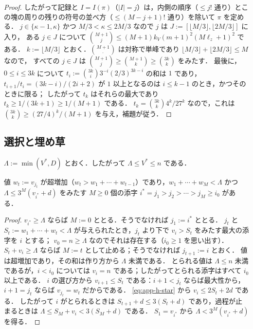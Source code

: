 \begin{proof}
したがって記録と $I=I(\pi)$（$|I|=j$）は，内側の順序（$\le j!$ 通り）とこの塊の周りの残りの符号の並べ方（$\le(M-j+1)!$ 通り）を除いて $\pi$ を定める．
$j\in\{\kappa-1,\kappa\}$ かつ $M/3<\kappa\le2M/3$ なので $j$ は $J:=[\lfloor M/3\rfloor,\lfloor2M/3\rfloor]$ に入り，
ある $j\in J$ について $\binom{M+1}{j}\le(M+1)k_V(m+1)^2(M\ell_z+1)^2$ である．
$k:=\lfloor M/3\rfloor$ とおく．$\binom{M+1}{\cdot}$ は対称で単峰であり $\lfloor M/3\rfloor+\lfloor2M/3\rfloor\le M$ なので，
すべての $j\in J$ は $\binom{M+1}{j}\ge\binom{M+1}{k}\ge\binom{3k}{k}$ をみたす．
最後に，$0\le i\le3k$ について $t_i:=\binom{3k}{i}3^{-i}(2/3)^{3k-i}$ の和は $1$ であり，
$t_{i+1}/t_i=(3k-i)/(2i+2)$ が $1$ 以上となるのは $i\le k-1$ のとき，かつそのときに限る；
したがって $t_k$ はそれらの最大であり $t_k\ge1/(3k+1)\ge1/(M+1)$ である．
$t_k=\binom{3k}{k}4^k/27^k$ なので，これは $\binom{3k}{k}\ge(27/4)^k/(M+1)$ を与え，補題が従う．
\end{proof}

\subsection{選択と埋め草}

$\Lambda:=\min(V^*,D)$ とおく．したがって $\Lambda\le V^*\le n$ である．

\begin{lemma}[選択]
\label{lem:app-h-select}
値 $w_t:=v_{j_t}$ が超増加（$w_t>w_1+\cdots+w_{t-1}$）であり，$w_1+\cdots+w_M<\Lambda$ かつ $\Lambda\le3^M(v_{i^*}+d)$ をみたす
$M\ge0$ 個の添字 $i^*=j_1>j_2>\cdots>j_M\ge i_0$ がある．
\end{lemma}

\begin{proof}
$v_{i^*}\ge\Lambda$ ならば $M:=0$ ととる．そうでなければ $j_1:=i^*$ ととる．
$j_t$ と $S_t:=w_1+\cdots+w_t<\Lambda$ が与えられたとき，$j_t$ より下で $v_i>S_t$ をみたす最大の添字を $i$ とする；
$v_0=n\ge\Lambda$ なのでそれは存在する（$i_0\ge1$ を思い出す）．
$S_t+v_i\ge\Lambda$ ならば $M:=t$ として止める；そうでなければ $j_{t+1}:=i$ とおく．
値は超増加であり，その和は作り方から $\Lambda$ 未満である．
とられる値は $\Lambda\le n$ 未満であるが，$i<i_0$ については $v_i=n$ である；したがってとられる添字はすべて $i_0$ 以上である．
$i$ の選び方から $v_{i+1}\le S_t$ である：$i+1<j_t$ ならば最大性から，$i+1=j_t$ ならば $v_{j_t}=w_t$ だからである．
\eqref{eq:app-h-star} から $v_i\le2S_t+2d$ である．
したがって $i$ がとられるときは $S_{t+1}+d\le3(S_t+d)$ であり，過程が止まるときは $\Lambda\le S_M+v_i<3(S_M+d)$ である．
$S_1=v_{i^*}$ から $\Lambda<3^M(v_{i^*}+d)$ を得る．
\end{proof}

